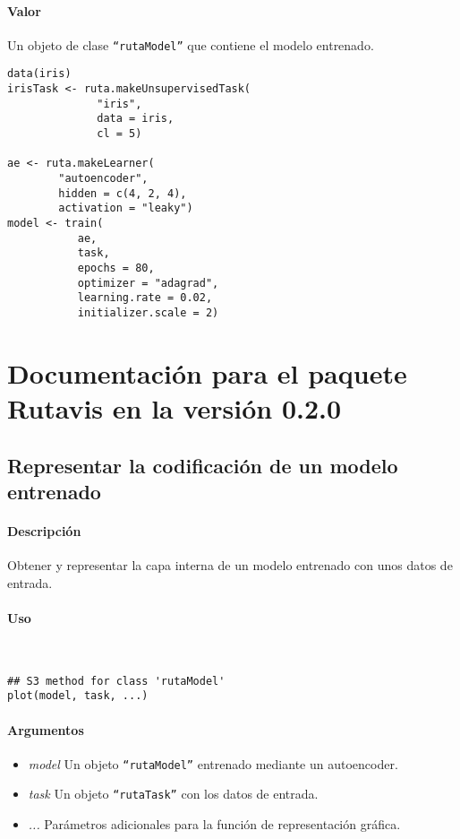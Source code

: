 \paragraph{Valor}
Un objeto de clase \texttt{``rutaModel''} que contiene el modelo entrenado.

\begin{lstlisting}
data(iris)
irisTask <- ruta.makeUnsupervisedTask(
              "iris",
              data = iris,
              cl = 5)

ae <- ruta.makeLearner(
        "autoencoder",
        hidden = c(4, 2, 4),
        activation = "leaky")
model <- train(
           ae,
           task,
           epochs = 80,
           optimizer = "adagrad",
           learning.rate = 0.02,
           initializer.scale = 2)         
\end{lstlisting}

\section{Documentación para el paquete Rutavis en la versión 0.2.0}

\subsection{Representar la codificación de un modelo entrenado}

\paragraph{Descripción}
Obtener y representar la capa interna de un modelo entrenado con unos datos de entrada.

\paragraph{Uso}
~

\begin{lstlisting}
## S3 method for class 'rutaModel'
plot(model, task, ...)
\end{lstlisting}

\paragraph{Argumentos}
\begin{itemize}
\item \emph{model}	Un objeto \texttt{``rutaModel''} entrenado mediante un autoencoder.
\item \emph{task}	Un objeto \texttt{``rutaTask''} con los datos de entrada.
\item \emph{...}	Parámetros adicionales para la función de representación gráfica.
\end{itemize}

